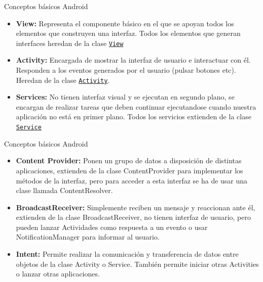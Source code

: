 \documentclass{beamer}
\begin{document}
\begin{frame}{Conceptos básicos Android}
  \begin{itemize}
    \item {\textbf{View:} Representa el componente básico en el que se apoyan todos los elementos que construyen una interfaz. Todos los elementos que generan interfaces heredan de la clase \texttt{\href{http://developer.android.com/reference/android/view/View.html}{View}}
    \pause
    }

  \item<2-> {
    \textbf{Activity:} Encargada de mostrar la interfaz de usuario e interactuar con él. Responden a los eventos generados por el usuario (pulsar botones etc). Heredan de la clase \href{http://developer.android.com/reference/android/app/Activity.html}{\texttt{Activity}}.
  }
  \item<3-> { \textbf{Services:} No tienen interfaz visual y se ejecutan en segundo plano, se encargan de realizar tareas que deben continuar ejecutandose cuando nuestra aplicación no está en primer plano. Todos los servicios extienden de la clase \texttt{\href{http://developer.android.com/reference/android/app/Service.html}{Service}}
  }
  \end{itemize}
\end{frame}

\begin{frame}{Conceptos básicos Android}
  \begin{itemize}
  \item{
    \textbf{Content Provider:} Ponen un grupo de datos a disposición de distintas aplicaciones, extienden de la clase ContentProvider para implementar los métodos de la interfaz, pero para acceder a esta interfaz se ha de usar una clase llamada ContentResolver.
    \pause
  }
  \item<2-> {
    \textbf{BroadcastReceiver:} Simplemente reciben un mensaje y reaccionan ante él, extienden de la clase BroadcastReceiver, no tienen interfaz de usuario, pero pueden lanzar Actividades como respuesta a un evento o usar NotificationManager para informar al usuario.
  }
  \item<3-> {
    \textbf{Intent:} Permite realizar la comunicación y transferencia de datos entre objetos de la clase Activity o Service. También permite iniciar otras Activities o lanzar otras aplicaciones.
  }
  \end{itemize}
\end{frame}
\end{document}
